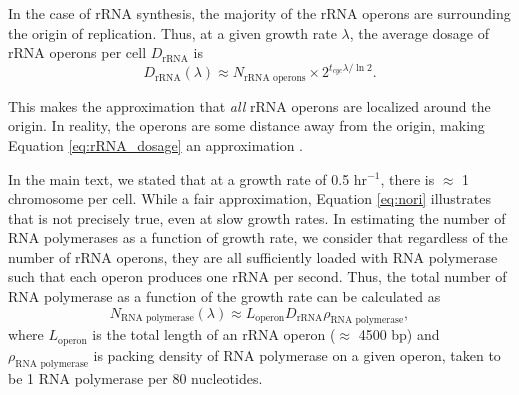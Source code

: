 In the case of rRNA synthesis, the majority of the rRNA operons are surrounding
the origin of replication. Thus, at a given growth rate $\lambda$, the average
dosage of rRNA operons per cell $D_\text{rRNA}$ is
\begin{equation}
D_\text{rRNA}(\lambda) \approx N_\text{rRNA operons} \times 2^{t_{cyc} \lambda / \ln 2}.
\label{eq:rRNA_dosage}
\end{equation}

This makes the approximation that \textit{all} rRNA operons are localized around
the origin. In reality, the operons are some distance away from the origin,
making Equation \ref{eq:rRNA_dosage} an approximation \citep{dennis2004}.

In the main text, we stated that at a growth rate of 0.5 hr$^{-1}$, there is
$\approx$ 1 chromosome per cell. While a fair approximation, Equation \ref{eq:nori}
illustrates that is not precisely true, even at slow growth rates. In estimating
the number of RNA polymerases as a function of growth rate, we consider that
regardless of the number of rRNA operons, they are all sufficiently loaded with
RNA polymerase such that each operon produces one rRNA per second. Thus, the
total number of RNA polymerase as a function of the growth rate can be
calculated as
\begin{equation}
    N_\text{RNA polymerase}(\lambda) \approx L_\text{operon}D_\text{rRNA}\rho_\text{RNA polymerase},
\end{equation}
where $L_\text{operon}$ is the total length of an rRNA operon ($\approx$ 4500
bp) and $\rho_\text{RNA polymerase}$ is packing density of RNA polymerase on a
given operon, taken to be 1 RNA polymerase per 80 nucleotides.
